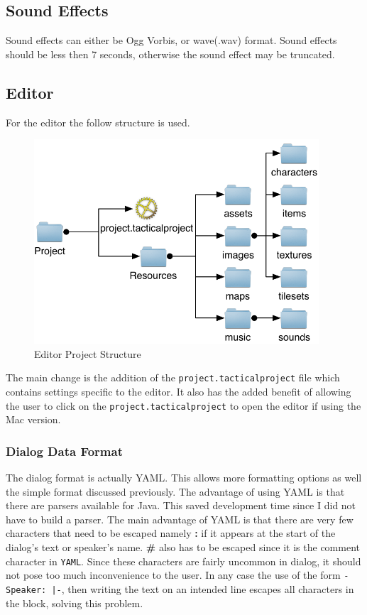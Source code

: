 \subsection{Sound Effects}
Sound effects can either be Ogg Vorbis, or wave(.wav) format. Sound effects should be less then 7 seconds, otherwise the sound effect may be truncated. 

\clearpage
\subsection{Editor}
For the editor the follow structure is used.

\begin{figure}[htbp]
	\centering
		\includegraphics[height=3in]{figures/project.pdf}
	\caption{Editor Project Structure}
	\label{fig:figures_project}
\end{figure}

The main change is the addition of the \texttt{project.tacticalproject} file which contains settings specific to the editor. It also has the added benefit of allowing the user to click on the \texttt{project.tacticalproject} to open the editor if using the Mac version.

\subsubsection{Dialog Data Format}
\label{ssub:dialog_data_format}

The dialog format is actually YAML\cite{yaml}. This allows more formatting options as well the simple format discussed previously. The advantage of using YAML is that there are parsers available for Java\cite{snake}. This saved development time since I did not have to build a parser. The main advantage of YAML is that there are very few characters that need to be escaped namely \textbf{:} if it appears at the start of the dialog's text or speaker's name. \textbf{\#} also has to be escaped since it is the comment character in \texttt{YAML}. Since these characters are fairly uncommon in dialog, it should not pose too much inconvenience to the user. In any case the use  of the form \texttt{- Speaker: |-}, then  writing the text on an intended line escapes all characters in the block, solving this problem.

